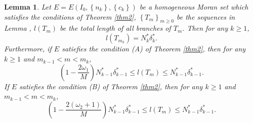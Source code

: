 \documentclass[reqno]{amsart}
\theoremstyle{plain}
\newtheorem{lem}{Lemma}
\theoremstyle{definition}
\theoremstyle{remark}
\numberwithin{equation}{section} \DeclareMathOperator\intr{int}
\begin{document}
\begin{lem}\label{l7}
	Let $E=E(I_{0},\left\{n_{k}\right\},\left\{c_{k}\right\})$ be a homogeneous Moran set which satisfies the conditions of Theorem \ref{thm2}, $\left\{T_{m}\right\}_{m\ge0}$ be the sequences in Lemma \text{\rm\ref{l6}},
$l(T_{m})$ be the total length of all branches of $T_{m}$.
Then for any $k\ge 1$,
\begin{equation}
l(T_{m_{k}})=N^*_k\delta^*_k.
\end{equation}
Furthermore, if $E$ satiefies the condition {\rm(A)} of Theorem {\rm\ref{thm2}}, then for any $k\ge 1$ and $m_{k-1}<m<m_k$,
\begin{equation}
(1-\frac{2\omega_1}{M})N^*_{k-1}\delta^*_{k-1}\le l(T_m) \le N^*_{k-1}\delta^*_{k-1}.
\end{equation}
If $E$ satiefies the condition {\rm(B)} of Theorem {\rm\ref{thm2}}, then for any $k\ge 1$ and $m_{k-1}<m<m_k$,
\begin{equation}
(1-\frac{2(\omega_2+1)}{M})N^*_{k-1}\delta^*_{k-1}\le l(T_m) \le N^*_{k-1}\delta^*_{k-1}.
\end{equation}

\end{lem}
\end{document}
